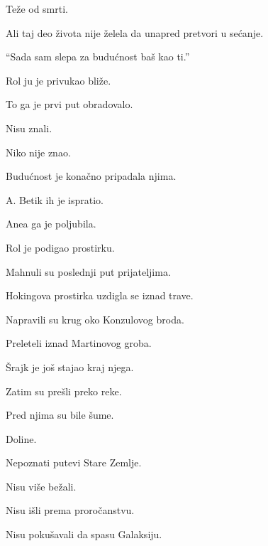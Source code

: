 Teže od smrti.

\bigskip

Ali taj deo života nije želela da unapred pretvori u sećanje.

\bigskip

``Sada sam slepa za budućnost baš kao ti.''

\bigskip

Rol ju je privukao bliže.

\bigskip

To ga je prvi put obradovalo.

\bigskip

Nisu znali.

\bigskip

Niko nije znao.

\bigskip

Budućnost je konačno pripadala njima.

\bigskip

A. Betik ih je ispratio.

\bigskip

Anea ga je poljubila.

\bigskip

Rol je podigao prostirku.

\bigskip

Mahnuli su poslednji put prijateljima.

\bigskip

Hokingova prostirka uzdigla se iznad trave.

\bigskip

Napravili su krug oko Konzulovog broda.

\bigskip

Preleteli iznad Martinovog groba.

\bigskip

Šrajk je još stajao kraj njega.

\bigskip

Zatim su prešli preko reke.

\bigskip

Pred njima su bile šume.

Doline.

Nepoznati putevi Stare Zemlje.

\bigskip

Nisu više bežali.

\bigskip

Nisu išli prema proročanstvu.

\bigskip

Nisu pokušavali da spasu Galaksiju.


